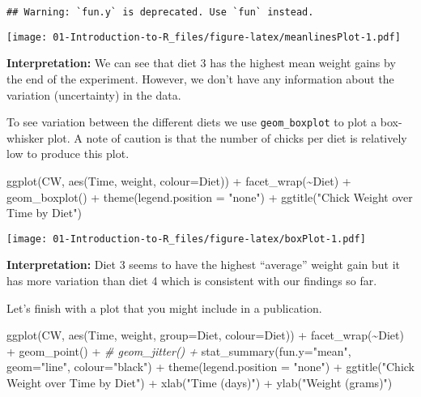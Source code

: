\documentclass[
]{book}
\newenvironment{Shaded}{\begin{snugshade}}{\end{snugshade}}
\newcommand{\AttributeTok}[1]{\textcolor[rgb]{0.77,0.63,0.00}{#1}}
\newcommand{\CommentTok}[1]{\textcolor[rgb]{0.56,0.35,0.01}{\textit{#1}}}
\newcommand{\FunctionTok}[1]{\textcolor[rgb]{0.00,0.00,0.00}{#1}}
\newcommand{\NormalTok}[1]{#1}
\newcommand{\SpecialCharTok}[1]{\textcolor[rgb]{0.00,0.00,0.00}{#1}}
\newcommand{\StringTok}[1]{\textcolor[rgb]{0.31,0.60,0.02}{#1}}
\begin{document}
\begin{verbatim}
## Warning: `fun.y` is deprecated. Use `fun` instead.
\end{verbatim}

\texttt{[image: 01-Introduction-to-R\_files/figure-latex/meanlinesPlot-1.pdf]}

\textbf{Interpretation:}
We can see that diet 3 has the highest mean weight gains by the end of the experiment. However,
we don't have any information about the variation (uncertainty) in the data.

To see variation between the different diets we use \texttt{geom\_boxplot} to plot a box-whisker plot.
A note of caution is that the number of chicks per diet is relatively low to produce this plot.

\begin{Shaded}
\begin{Highlighting}[]
\FunctionTok{ggplot}\NormalTok{(CW, }\FunctionTok{aes}\NormalTok{(Time, weight, }\AttributeTok{colour=}\NormalTok{Diet)) }\SpecialCharTok{+}
  \FunctionTok{facet\_wrap}\NormalTok{(}\SpecialCharTok{\textasciitilde{}}\NormalTok{Diet) }\SpecialCharTok{+}
  \FunctionTok{geom\_boxplot}\NormalTok{() }\SpecialCharTok{+}
  \FunctionTok{theme}\NormalTok{(}\AttributeTok{legend.position =} \StringTok{"none"}\NormalTok{) }\SpecialCharTok{+}
  \FunctionTok{ggtitle}\NormalTok{(}\StringTok{"Chick Weight over Time by Diet"}\NormalTok{)}
\end{Highlighting}
\end{Shaded}

\texttt{[image: 01-Introduction-to-R\_files/figure-latex/boxPlot-1.pdf]}

\textbf{Interpretation:}
Diet 3 seems to have the highest ``average'' weight gain but it has more variation
than diet 4 which is consistent with our findings so far.

Let's finish with a plot that you might include in a publication.

\begin{Shaded}
\begin{Highlighting}[]
\FunctionTok{ggplot}\NormalTok{(CW, }\FunctionTok{aes}\NormalTok{(Time, weight, }\AttributeTok{group=}\NormalTok{Diet, }
                             \AttributeTok{colour=}\NormalTok{Diet)) }\SpecialCharTok{+}
  \FunctionTok{facet\_wrap}\NormalTok{(}\SpecialCharTok{\textasciitilde{}}\NormalTok{Diet) }\SpecialCharTok{+}
  \FunctionTok{geom\_point}\NormalTok{() }\SpecialCharTok{+}
  \CommentTok{\# geom\_jitter() +}
  \FunctionTok{stat\_summary}\NormalTok{(}\AttributeTok{fun.y=}\StringTok{"mean"}\NormalTok{, }\AttributeTok{geom=}\StringTok{"line"}\NormalTok{,}
               \AttributeTok{colour=}\StringTok{"black"}\NormalTok{) }\SpecialCharTok{+}
  \FunctionTok{theme}\NormalTok{(}\AttributeTok{legend.position =} \StringTok{"none"}\NormalTok{) }\SpecialCharTok{+}
  \FunctionTok{ggtitle}\NormalTok{(}\StringTok{"Chick Weight over Time by Diet"}\NormalTok{) }\SpecialCharTok{+} 
  \FunctionTok{xlab}\NormalTok{(}\StringTok{"Time (days)"}\NormalTok{) }\SpecialCharTok{+}
  \FunctionTok{ylab}\NormalTok{(}\StringTok{"Weight (grams)"}\NormalTok{)}
\end{Highlighting}
\end{Shaded}
\end{document}

